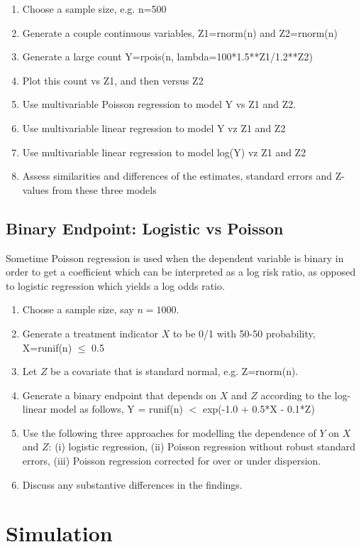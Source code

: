 \documentclass[12pt]{article}
\newenvironment{enum1}
{\begin{enumerate}
  \setlength{\itemsep}{1pt}
  \setlength{\parskip}{0pt}
  \setlength{\parsep}{0pt}
}{\end{enumerate}}
\begin{document}
\begin{enum1}
	\item Choose a sample size, e.g. n=500
	\item Generate a couple continuous variables, Z1=rnorm(n) and Z2=rnorm(n)
	\item Generate a large count Y=rpois(n, lambda=100*1.5**Z1/1.2**Z2)
	\item Plot this count vs Z1, and then versus Z2
	\item Use multivariable Poisson regression to model Y vs Z1 and Z2.
	\item Use multivariable linear regression to model Y vz Z1 and Z2
	\item Use multivariable linear regression to model log(Y) vz Z1 and Z2
	\item Assess similarities and differences of the estimates, standard errors and Z-values from these three models
\end{enum1}

\subsection{Binary Endpoint: Logistic vs Poisson}

Sometime Poisson regression is used when the dependent variable is binary in order to get a coefficient which can be interpreted as a log risk ratio, as opposed to logistic regression which yields a log odds ratio.

\begin{enum1}
	\item Choose a sample size, say $n=1000$. 
	\item Generate a treatment indicator $X$ to be 0/1 with 50-50 probability, X=runif(n) $\leq$ 0.5
	\item Let $Z$ be a covariate that is standard normal, e.g. Z=rnorm(n).
	\item Generate a binary endpoint that depends on $X$ and $Z$ according to the log-linear model as follows, Y = runif(n) $<$ exp(-1.0 + 0.5*X - 0.1*Z) 
	\item Use the following three approaches for modelling the dependence of $Y$ on $X$ and $Z$: (i) logistic regression, (ii) Poisson regression without robust standard errors, (iii) Poisson regression corrected for over or under dispersion.
	\item Discuss any substantive differences in the findings.
\end{enum1}

\section{Simulation}
\end{document}
